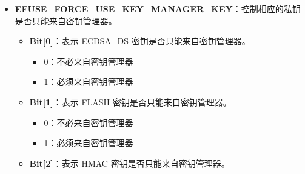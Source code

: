 \documentclass[main\_\_CN.tex]{subfiles}
\begin{document}
\begin{enumerate}
\begin{itemize}
\begin{itemize}
\begin{itemize}
            \end{itemize}
            \item \textbf{Bit[2]}：配置 HMAC 密钥是否只能部署一次。
            \begin{itemize}
                \item 0：可以部署多次
                \item 1：只能部署一次
            \end{itemize}
            \item \textbf{Bit[3]}：配置 RSA\_DS\_KEY 是否只能部署一次。
            \begin{itemize}
                \item 0：可以部署多次
                \item 1：只能部署一次
            \end{itemize}
            \item \textbf{Bit[4]}：配置 PSRAM 密钥是否只能部署一次。
            \begin{itemize}
                \item 0：可以部署多次
                \item 1：只能部署一次
            \end{itemize}
        \end{itemize}
        \item \textbf{\hyperref[fielddesc:EFUSEFORCEUSEKEYMANAGERKEY]{EFUSE\_FORCE\_USE\_KEY\_MANAGER\_KEY}}：控制相应的私钥是否只能来自密钥管理器。
        \begin{itemize}
            \item \textbf{Bit[0]}：表示 ECDSA\_DS 密钥是否只能来自密钥管理器。
            \begin{itemize}
                \item 0：不必来自密钥管理器
                \item 1：必须来自密钥管理器
            \end{itemize}
            \item \textbf{Bit[1]}：表示 FLASH 密钥是否只能来自密钥管理器。
            \begin{itemize}
                \item 0：不必来自密钥管理器
                \item 1：必须来自密钥管理器
            \end{itemize}
            \item \textbf{Bit[2]}：表示 HMAC 密钥是否只能来自密钥管理器。
            \begin{itemize}

\end{itemize}
\end{itemize}
\end{itemize}
\end{enumerate}
\end{document}
